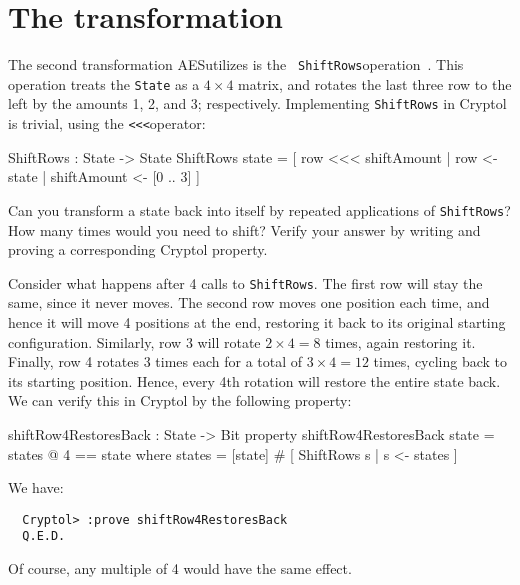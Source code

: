\section{The {} transformation}
\label{aes:shiftrows}


The second transformation AES\indAES utilizes is the {\tt
  ShiftRows}\indAESShiftRows operation~\cite[Section 5.1.2]{aes}. This
operation treats the {\tt State} as a $4\times4$ matrix, and rotates
the last three row to the left by the amounts 1, 2, and 3;
respectively.  Implementing {\tt ShiftRows} in Cryptol is trivial,
using the \verb+<<<+\indRotLeft operator:
\begin{code}
  ShiftRows : State -> State
  ShiftRows state = [ row <<< shiftAmount | row <- state
                                          | shiftAmount <- [0 .. 3]
                    ]
\end{code}

\begin{Exercise}\label{ex:aesshiftrows:0}
  Can you transform a state back into itself by repeated applications
  of {\tt ShiftRows}? How many times would you need to shift?  Verify
  your answer by writing and proving a corresponding Cryptol property.
\end{Exercise}
\begin{Answer}
  Consider what happens after 4 calls to {\tt ShiftRows}. The first
  row will stay the same, since it never moves. The second row moves
  one position each time, and hence it will move 4 positions at the
  end, restoring it back to its original starting
  configuration. Similarly, row 3 will rotate $2\times4=8$ times,
  again restoring it. Finally, row 4 rotates 3 times each for a total
  of $3\times4 = 12$ times, cycling back to its starting
  position. Hence, every 4th rotation will restore the entire state
  back. We can verify this in Cryptol by the following property:
\begin{code}
  shiftRow4RestoresBack : State -> Bit
  property shiftRow4RestoresBack state = states @ 4 == state
     where states = [state] # [ ShiftRows s | s <- states ]
\end{code}
We have:
\begin{Verbatim}
  Cryptol> :prove shiftRow4RestoresBack
  Q.E.D.
\end{Verbatim}
Of course, any multiple of 4 would have the same effect.
\end{Answer}

